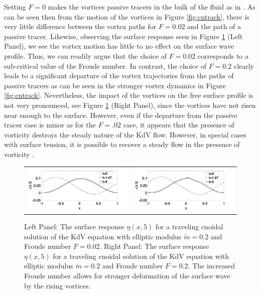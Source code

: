 \documentclass[a4paper,11pt]{article}
\begin{document}
Setting $F=0$ makes the vortices passive tracers in the bulk of the fluid as in \cite{kalisch}.  As can be seen then from the motion of the vortices in Figure \ref{fig:cntrack}, there is very little difference between the vortex paths for $F=0.02$ and the path of a passive tracer.  Likewise, observing the surface response seen in Figure \ref{fig:cnsurfrep} (Left Panel), we see the vortex motion has little to no effect on the surface wave profile.  Thus, we can readily argue that the choice of $F=0.02$ corresponds to a sub-critical value of the Froude number.  In contrast, the choice of $F=0.2$ clearly leads to a significant departure of the vortex trajectories from the paths of passive tracers as can be seen in the stronger vortex dynamics in Figure \ref{fig:cntrack}.  Nevertheless, the impact of the vortices on the free surface profile is not very pronounced, see Figure \ref{fig:cnsurfrep} (Right Panel), since the vortices have not risen near enough to the surface.  However, even if the departure from the passive tracer case is minor as for the $F=.02$ case, it appears that the presence of vorticity destroys the steady nature of the KdV flow.  However, in special cases with surface tension, it is possible to recover a steady flow in the presence of vorticity \cite{walsh}.  
\begin{figure}[h]
\centering
\begin{tabular}{cc}
\includegraphics[width=.48\textwidth]{surf_resp_cnoid_mu_pt2_F_pt02_tf_5NEW} & 
\includegraphics[width=.48\textwidth]{surf_resp_cnoid_mu_pt2_F_pt2_tf_5NEW}
\end{tabular}
\caption{\small Left Panel: The surface response $\eta(x,5)$ for a traveling cnoidal solution of the KdV equation with elliptic modulus $\tilde{m}=0.2$ and Froude number $F=0.02$. Right Panel: The surface response $\eta(x,5)$ for a traveling cnoidal solution of the KdV equation with elliptic modulus $\tilde{m}=0.2$ and Froude number $F=0.2$. The increased Froude number allows for stronger deformation of the surface wave by the rising vortices.}
\label{fig:cnsurfrep}
\end{figure}
\end{document}
